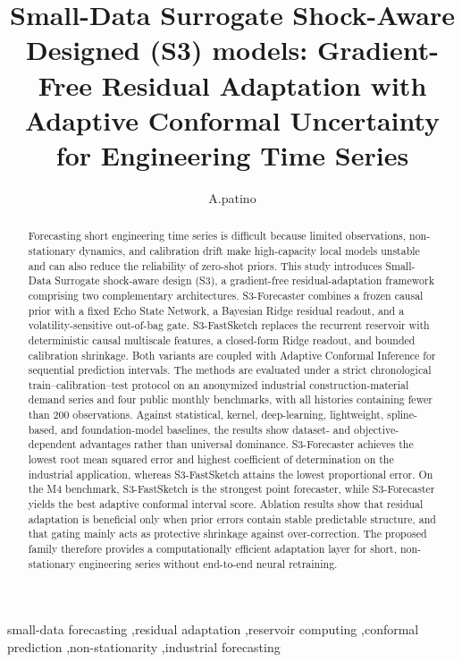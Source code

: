 \documentclass[review,number,sort&compress]{elsarticle}
\begin{document}
\begin{frontmatter}

\title{Small-Data Surrogate Shock-Aware Designed (S3) models: Gradient-Free Residual Adaptation with Adaptive Conformal Uncertainty for Engineering Time Series}
\author{A.patino}

\begin{abstract}
Forecasting short engineering time series is difficult because limited
observations, non-stationary dynamics, and calibration drift make
high-capacity local models unstable and can also reduce the reliability
of zero-shot priors. This study introduces Small-Data Surrogate
shock-aware design (S3), a gradient-free residual-adaptation framework
comprising two complementary architectures. S3-Forecaster combines a
frozen causal prior with a fixed Echo State Network, a Bayesian Ridge
residual readout, and a volatility-sensitive out-of-bag gate.
S3-FastSketch replaces the recurrent reservoir with deterministic causal
multiscale features, a closed-form Ridge readout, and bounded calibration
shrinkage. Both variants are coupled with Adaptive Conformal Inference
for sequential prediction intervals. The methods are evaluated under a
strict chronological train--calibration--test protocol on an anonymized
industrial construction-material demand series and four public monthly
benchmarks, with all histories containing fewer than 200 observations.
Against statistical, kernel, deep-learning, lightweight, spline-based,
and foundation-model baselines, the results show dataset- and
objective-dependent advantages rather than universal dominance.
S3-Forecaster achieves the lowest root mean squared error and highest
coefficient of determination on the industrial application, whereas
S3-FastSketch attains the lowest proportional error. On the M4 benchmark,
S3-FastSketch is the strongest point forecaster, while S3-Forecaster
yields the best adaptive conformal interval score. Ablation results show
that residual adaptation is beneficial only when prior errors contain
stable predictable structure, and that gating mainly acts as protective
shrinkage against over-correction. The proposed family therefore provides
a computationally efficient adaptation layer for short, non-stationary
engineering series without end-to-end neural retraining.
\end{abstract}

\begin{keyword}
small-data forecasting \sep residual adaptation \sep reservoir computing \sep conformal prediction \sep non-stationarity \sep industrial forecasting
\end{keyword}

\end{frontmatter}
\end{document}
